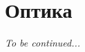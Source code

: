 \documentclass[12pt]{article}
\begin{document}


    \section{Оптика}




















    \begin{center}
        \vspace{2em}
        \textit{\LARGE To be continued...}
        \vspace{2em}
    \end{center}


    \newpage
    
\end{document}
